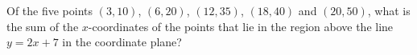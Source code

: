 Of the five points $(3,10)$, $(6,20)$, $(12,35)$, $(18,40)$ and $(20,50)$, what is the sum of the $x$-coordinates of the points that lie in the region above the line $y=2x+7$ in the coordinate plane?

